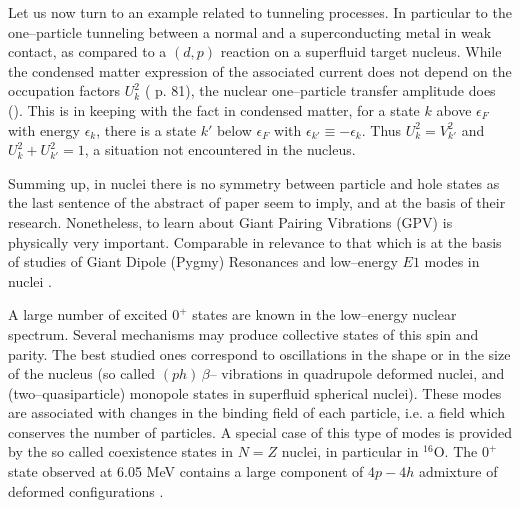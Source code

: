 \documentclass[a4paper,11pt]{article}
\numberwithin{equation}{section}
\numberwithin{figure}{section}
\numberwithin{table}{section}
\begin{document}
Let us now turn to an example related to tunneling processes. In particular to the one--particle tunneling between a normal and a superconducting metal in weak contact, as compared to a $(d,p) $ reaction on a superfluid target nucleus. While the condensed matter expression of the associated current does not depend on the occupation factors $U^2_k$ (\cite{Cohen:62,Schrieffer:64} p. 81), the nuclear one--particle transfer amplitude does (\cite{Idini:15}). This is in keeping with the fact in condensed matter, for a state $k$ above  $\epsilon_F$ with energy $\epsilon_k$, there is a state $k'$ below $\epsilon_F$ with $\epsilon_{k'}\equiv-\epsilon_k$. Thus $U^2_k=V_{k'}^2$ and $U_k^2+U^2_{k'}=1$, a situation not encountered in the nucleus. 

Summing up, in nuclei there is no symmetry between particle and hole states as the last sentence of the abstract of \cite{Cappuzzello:15} paper seem to imply, and at the basis of their research. Nonetheless, to learn about Giant Pairing Vibrations (GPV) \cite{Broglia:77,Cappuzzello:15} is physically very important. Comparable in relevance to that which is at the basis of studies of  Giant Dipole (Pygmy) Resonances and low--energy $E1$ modes in nuclei \cite{Savran:13}.


A large number of excited $0^+$ states are known in the low--energy nuclear spectrum. Several mechanisms may produce collective states of this spin and parity. The best studied ones correspond to oscillations in the shape or in the size of the nucleus (so called $(ph)\, \beta$-- vibrations in quadrupole deformed nuclei, and (two--quasiparticle) monopole states in superfluid spherical  nuclei). These modes are associated with changes in the binding field of each particle, i.e. a field which conserves the number of particles. A special case of this type of modes is provided by the so called coexistence states in $N=Z$ nuclei, in particular in $^{16}$O. The $0^+$ state observed at 6.05 MeV contains a large component of $4p-4h$ admixture of deformed configurations \cite{Brown:64,Engeland:65}.
\end{document}
